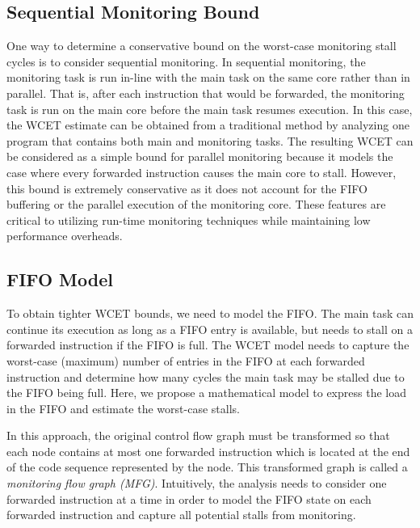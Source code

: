 \subsection{Sequential Monitoring Bound}
\label{sec:formulation:sequential}

One way to determine a conservative bound on the worst-case monitoring stall
cycles is to consider sequential monitoring.  In sequential monitoring, the
monitoring task is run in-line with the main task on the same core rather than
in parallel. That is, after each instruction that would be forwarded, the
monitoring task is run on the main core before the main task resumes execution.
In this case, the WCET estimate can be obtained from a traditional method by
analyzing one program that contains both main and monitoring tasks.  The
resulting WCET can be considered as a simple bound for parallel monitoring
because it models the case where every forwarded instruction causes the main
core to stall.  However, this bound is extremely conservative as it does not
account for the FIFO buffering or the parallel execution of the monitoring
core. These features are critical to utilizing run-time monitoring techniques
while maintaining low performance overheads.

\subsection{FIFO Model}
\label{sec:formulation:model}

To obtain tighter WCET bounds, we need to model the FIFO.  The main task can
continue its execution as long as a FIFO entry is available, but needs to stall
on a forwarded instruction if the FIFO is full. The WCET model needs to capture
the worst-case (maximum) number of entries in the FIFO at each forwarded
instruction and determine how many cycles the main task may be stalled due to
the FIFO being full. Here, we propose a mathematical model to express the load
in the FIFO and estimate the worst-case stalls.

In this approach, the original control flow graph must be transformed so that
each node contains at most one forwarded instruction which is located at the
end of the code sequence represented by the node.  This transformed graph is
called a {\em monitoring flow graph (MFG)}.  Intuitively, the analysis needs to
consider one forwarded instruction at a time in order to model the FIFO state
on each forwarded instruction and capture all potential stalls from monitoring. 

